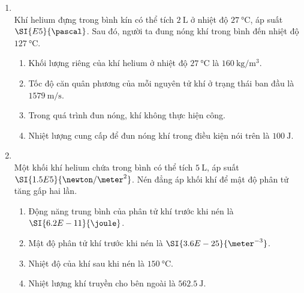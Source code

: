 \begin{enumerate}[label=\bfseries Câu \arabic*:, leftmargin=1.7cm]
\item {}\\
Khí helium đựng trong bình kín có thể tích $\SI{2}{\liter}$ ở nhiệt độ $\SI{27}{\celsius}$, áp suất $\SI{E5}{\pascal}$. Sau đó, người ta đung nóng khí trong bình đến nhiệt độ $\SI{127}{\celsius}$.
\begin{enumerate}[label=\alph*)]
	\item Khối lượng riêng của khí helium ở nhiệt độ $\SI{27}{\celsius}$ là $\SI{160}{\kilogram/\meter^3}$.
	\item Tốc độ căn quân phương của mỗi nguyên tử khí ở trạng thái ban đầu là $\SI{1579}{\meter/\second}$.
	\item Trong quá trình đun nóng, khí không thực hiện công.
	\item Nhiệt lượng cung cấp để đun nóng khí trong điều kiện nói trên là $\SI{100}{\joule}$.
\end{enumerate}

\item {}\\
Một khối khí helium chứa trong bình có thể tích $\SI{5}{\liter}$, áp suất $\SI{1.5E5}{\newton/\meter^2}$. Nén đẳng áp khối khí để mật độ phân tử tăng gấp hai lần.
\begin{enumerate}[label=\alph*)]
	\item Động năng trung bình của phân tử khí trước khi nén là $\SI{6.2E-11}{\joule}$.
	\item Mật độ phân tử khí trước khi nén là $\SI{3.6E-25}{\meter^{-3}}$.
	\item Nhiệt độ của khí sau khi nén là $\SI{150}{\celsius}$.
	\item Nhiệt lượng khí truyền cho bên ngoài là $\SI{562.5}{\joule}$.
\end{enumerate}
	
\end{enumerate}
